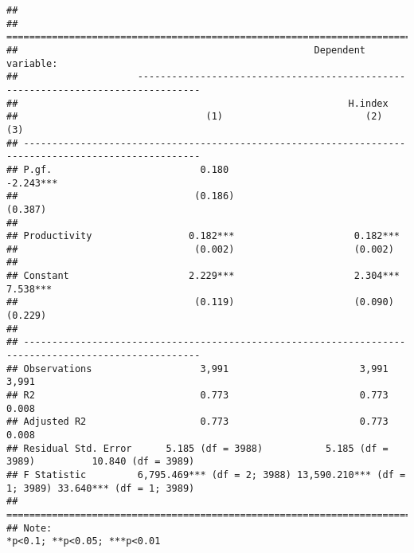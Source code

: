 \documentclass[
]{article}
\begin{document}
\begin{verbatim}
## 
## =====================================================================================================
##                                                    Dependent variable:                               
##                     ---------------------------------------------------------------------------------
##                                                          H.index                                     
##                                 (1)                         (2)                        (3)           
## -----------------------------------------------------------------------------------------------------
## P.gf.                          0.180                                                -2.243***        
##                               (0.186)                                                (0.387)         
##                                                                                                      
## Productivity                 0.182***                     0.182***                                   
##                               (0.002)                     (0.002)                                    
##                                                                                                      
## Constant                     2.229***                     2.304***                   7.538***        
##                               (0.119)                     (0.090)                    (0.229)         
##                                                                                                      
## -----------------------------------------------------------------------------------------------------
## Observations                   3,991                       3,991                      3,991          
## R2                             0.773                       0.773                      0.008          
## Adjusted R2                    0.773                       0.773                      0.008          
## Residual Std. Error      5.185 (df = 3988)           5.185 (df = 3989)          10.840 (df = 3989)   
## F Statistic         6,795.469*** (df = 2; 3988) 13,590.210*** (df = 1; 3989) 33.640*** (df = 1; 3989)
## =====================================================================================================
## Note:                                                                     *p<0.1; **p<0.05; ***p<0.01
\end{verbatim}
\end{document}
